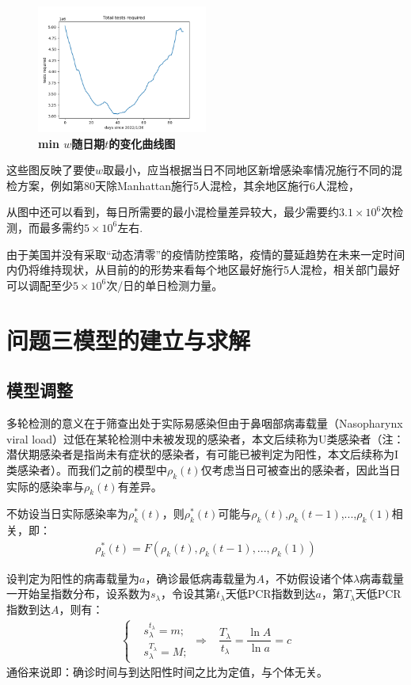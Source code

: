 \documentclass[withoutpreface,bwprint]{cumcmthesis} %
\begin{document}
\begin{figure}[H]
\centering
\includegraphics[width=0.5\textwidth]{nyc_total_tests_to_be_conducted.png}
\caption{\textbf{\rm{min} $w$随日期$t$的变化曲线图}}
\label{pro1}
\end{figure}

这些图反映了要使$w$取最小，应当根据当日不同地区新增感染率情况施行不同的混检方案，例如第80天除Manhattan施行5人混检，其余地区施行6人混检，

从图中还可以看到，每日所需要的最小混检量差异较大，最少需要约$3.1 \times 10^6$次检测，而最多需约$5 \times 10^6$左右.

由于美国并没有采取“动态清零”的疫情防控策略，疫情的蔓延趋势在未来一定时间内仍将维持现状，从目前的的形势来看每个地区最好施行5人混检，相关部门最好可以调配至少$5 \times 10^6$次/日的单日检测力量。

\section{问题三模型的建立与求解}
\subsection{模型调整}
多轮检测的意义在于筛查出处于实际易感染但由于鼻咽部病毒载量（Nasopharynx viral load）过低在某轮检测中未被发现的感染者，本文后续称为U类感染者（注：潜伏期感染者是指尚未有症状的感染者，有可能已被判定为阳性，本文后续称为I类感染者）。而我们之前的模型中$\rho_k(t)$仅考虑当日可被查出的感染者，因此当日实际的感染率与$\rho_k(t)$有差异。

不妨设当日实际感染率为$\rho^*_k(t)$，则$\rho^*_k(t)$可能与$\rho_k(t)$,$\rho_k(t-1)$,...,$\rho_k(1)$相关，即：
\begin{align}
    \rho^*_k(t) = F\left(\rho_k(t),\rho_k(t-1),...,\rho_k(1) \right)
\end{align}

设判定为阳性的病毒载量为$a$，确诊最低病毒载量为$A$，不妨假设诸个体$\lambda$病毒载量一开始呈指数分布，设系数为$s_\lambda$，令设其第$t_\lambda$天低PCR指数到达$a$，第$T_\lambda$天低PCR指数到达$A$，则有：
\begin{align}
\left\{
\begin{aligned}
    & s^{t_\lambda}_{\lambda}=m; \\
    & s^{T_\lambda}_{\lambda}=M; 
\end{aligned}
    \right.
    \Rightarrow & \dfrac{T_\lambda}{t_\lambda}=\dfrac{\ln A}{\ln a}=c
\end{align}
通俗来说即：确诊时间与到达阳性时间之比为定值，与个体无关。
\end{document}
